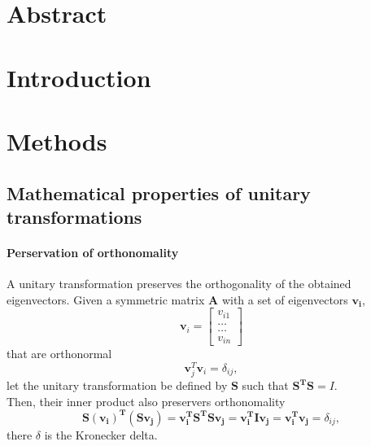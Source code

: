 \documentclass[%
oneside,                 %
final,                   %
10pt]{article}
\begin{document}







\thispagestyle{empty}


\tableofcontents
\newpage
\section{Abstract}
\section{Introduction}
\section{Methods}
\subsection{Mathematical properties of unitary transformations}
\paragraph{Perservation of orthonomality}
	A unitary transformation preserves the orthogonality of the obtained eigenvectors.
	Given a symmetric matrix $\mathbf{A}$ with a set of eigenvectors $\mathbf{v_i}$,
	\[
	\mathbf{v}_i = \begin{bmatrix} v_{i1} \\ \dots \\ \dots \\v_{in} \end{bmatrix}
	\]
	that are orthonormal
	\begin{equation}
	\mathbf{v}_j^T\mathbf{v}_i = \delta_{ij},
	\end{equation}
	let the unitary transformation be defined by $\mathbf{S}$ such that $\mathbf{S^TS} = I$. \\
Then, their inner product also preservers orthonomality
\begin{equation}
\mathbf{S(v_i)^T(Sv_j)}= \mathbf{v_i^TS^TSv_j}=\mathbf{v_i^TIv_j} = \mathbf{v_i^Tv_j} =\delta_{ij},
\end{equation}
there $\delta$ is the Kronecker delta.
\end{document}
